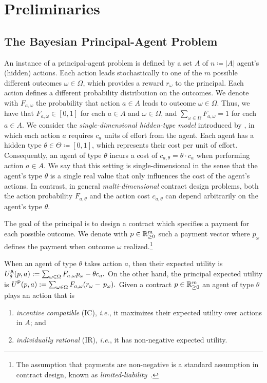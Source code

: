 \section{Preliminaries}

\subsection{The Bayesian Principal-Agent Problem}\label{sec:preliminaries_problem}


An instance of a principal-agent problem is defined by a set $A$ of $n \coloneqq |A|$ agent's (hidden) actions. 
Each action leads stochastically to one of the $m$ possible different outcomes $\omega\in \Omega$, which provides  a reward $r_\omega$ to the principal. Each action defines a different probability distribution on the outcomes. We denote with $F_{a,\omega}$ the probability that action $a\in A$ leads to outcome $\omega\in \Omega$. Thus, we have that $F_{a,\omega}\in[0,1]$ for each $a\in A$ and $\omega\in\Omega$, and $\sum_{\omega\in\Omega}F_{a,\omega}=1$ for each $a\in A$. We consider the \emph{single-dimensional hidden-type model} introduced by \citet{alon2021contracts}, in which each action $a$ requires $c_a$ units of effort from the agent. Each agent has a hidden type $\theta\in\Theta\coloneqq [0,1]$, which represents their cost per unit of effort. Consequently, an agent of type $\theta$ incurs a cost of $c_{a,\theta}=\theta\cdot c_a$ when performing action $a\in A$.
%
We say that this setting is single-dimensional in the sense that the agent's type $\theta$ is a single real value that only influences the cost of the agent's actions. In contrast, in general \emph{multi-dimensional} contract design problems, both the action probability $F_{a,\theta}$ and the action cost $c_{a,\theta}$ can depend arbitrarily on the agent's type $\theta$.


The goal of the principal is to design a contract which specifies a payment for each possible outcome. We denote with $p\in\mathbb{R}^m_{\ge 0}$ such a payment vector where $p_\omega$ defines the payment when outcome $\omega$ realized.\footnote{The assumption that payments are non-negative is a standard assumption in contract design, known as \emph{limited-liability}~\citep{carroll2015robustness, innes1990limited}.}


When an agent of type $\theta$ takes action $a$, then their expected utility is
\(
U^\textsf{A}_\theta(p,a):=\sum_{\omega \in \Omega} F_{ a, \omega } p_\omega - \theta c_{a}.
\)
On the other hand, the principal expected utility is 
\(
U^\textsf{P}(p,a):= \sum_{\omega \in \Omega} F_{a, \omega} (r_\omega - \, p_\omega).
\)
Given a contract $p\in\mathbb{R}^m_{\ge 0}$ an agent of type $\theta$ plays an action that is
\begin{enumerate}
	\item \emph{incentive compatible} (IC), \emph{i.e.}, it maximizes their expected utility over actions in $A$; and
	\item \emph{individually rational} (IR), \emph{i.e.}, it has non-negative expected utility.
\end{enumerate}


